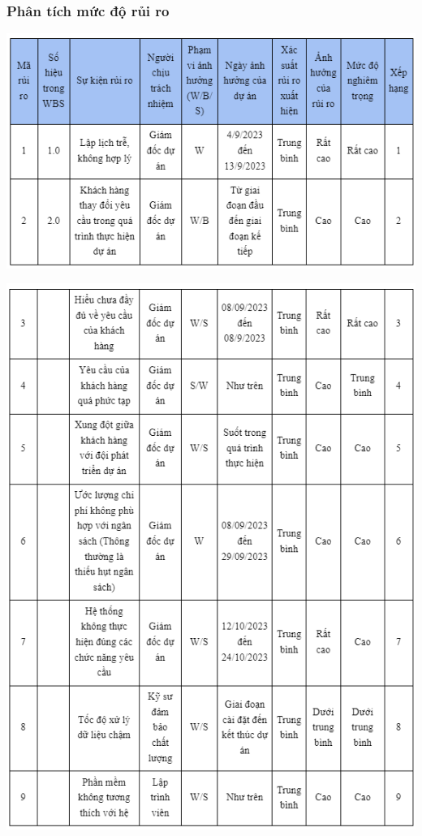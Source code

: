 \documentclass[12pt]{article}
\begin{document}
\subsubsection{Phân tích mức độ rủi ro}
\hspace{-2cm}\includegraphics[width=19cm]{II_7_4_1.png}
\par
\hspace{-2.6cm}\includegraphics[width=19cm]{II_7_4_2.png}
\end{document}
